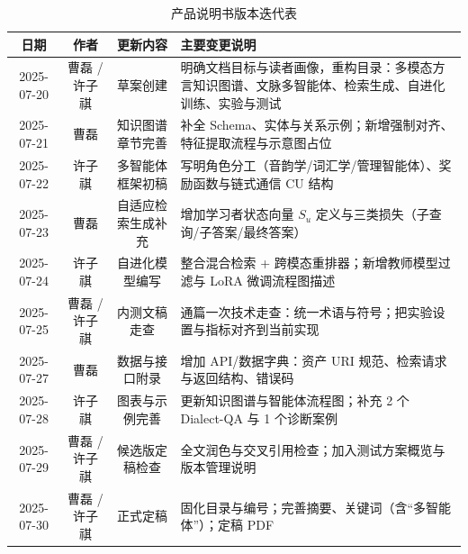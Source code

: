 \documentclass[fontset=windows]{thuthesis}
\begin{document}
\begin{table}[H]
\centering
\caption{产品说明书版本迭代表}
\begin{tabularx}{\textwidth}{|c|c|c|X|}
\hline
日期 & 作者 & 更新内容 & 主要变更说明 \\
\hline
2025-07-20 & 曹磊 / 许子祺 & 草案创建 & 明确文档目标与读者画像，重构目录：多模态方言知识图谱、文脉多智能体、检索生成、自进化训练、实验与测试 \\
\hline
2025-07-21 & 曹磊 & 知识图谱章节完善 & 补全 Schema、实体与关系示例；新增强制对齐、特征提取流程与示意图占位 \\
\hline
2025-07-22 & 许子祺 & 多智能体框架初稿 & 写明角色分工（音韵学/词汇学/管理智能体）、奖励函数与链式通信 CU 结构 \\
\hline
2025-07-23 & 曹磊 & 自适应检索生成补充 & 增加学习者状态向量 $S_u$ 定义与三类损失（子查询/子答案/最终答案） \\
\hline
2025-07-24 & 许子祺 & 自进化模型编写 & 整合混合检索 + 跨模态重排器；新增教师模型过滤与 LoRA 微调流程图描述 \\
\hline
2025-07-25 & 曹磊 / 许子祺 & 内测文稿走查 & 通篇一次技术走查：统一术语与符号；把实验设置与指标对齐到当前实现 \\
\hline
2025-07-27 & 曹磊 & 数据与接口附录 & 增加 API/数据字典：资产 URI 规范、检索请求与返回结构、错误码 \\
\hline
2025-07-28 & 许子祺 & 图表与示例完善 & 更新知识图谱与智能体流程图；补充 2 个 Dialect-QA 与 1 个诊断案例 \\
\hline
2025-07-29 & 曹磊 / 许子祺 & 候选版定稿检查 & 全文润色与交叉引用检查；加入测试方案概览与版本管理说明 \\
\hline
2025-07-30 & 曹磊 / 许子祺 & 正式定稿 & 固化目录与编号；完善摘要、关键词（含“多智能体”）；定稿 PDF \\
\hline
\end{tabularx}
\end{table}%
\tableofcontents

\mainmatter







\appendix

\end{document}
